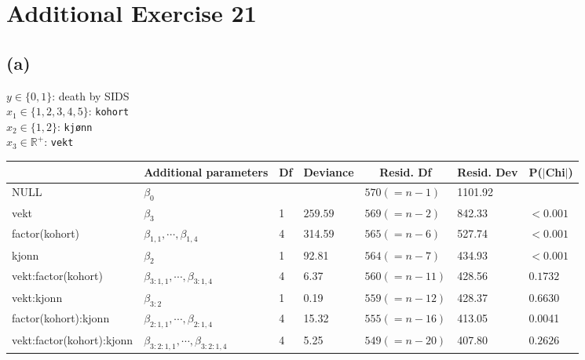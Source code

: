 \section*{Additional Exercise 21}
\subsection*{(a)}
$y \in \{0,1\}$: death by SIDS\\
$x_{1} \in \{1,2,3,4,5\}$: \texttt{kohort}\\
$x_{2} \in \{1,2\}$: \texttt{kj{\o}nn}\\
$x_{3} \in \mathbb{R}^{+}$: \texttt{vekt}\\

\begin{table}[ht]
\centering
\begin{tabular}{l|l|l|l|l|l|l|}
\cline{2-7}
\multicolumn{1}{c|}{} & Additional parameters & \multicolumn{1}{c|}{Df} & \multicolumn{1}{c|}{Deviance} & \multicolumn{1}{c|}{Resid. Df} & \multicolumn{1}{c|}{Resid. Dev} & P($\vert$Chi$\vert$) \\ \hline
%
\multicolumn{1}{|l|}{NULL} & $\beta_{0}$ & & & {\color[HTML]{3531FF} $570 (=n-1)$} & {\color[HTML]{3531FF} 1101.92} & \\ \hline
\multicolumn{1}{|l|}{vekt} & $\beta_{3}$ & 1 & $259.59$ & {\color[HTML]{3531FF} $569 (=n-2)$} & {\color[HTML]{3531FF} 842.33} & $< 0.001$ \\ \hline
\multicolumn{1}{|l|}{factor(kohort)} & $\beta_{1,1}, \cdots, \beta_{1,4}$ & 4 & 314.59 & $565 (=n-6)$ & {\color[HTML]{3531FF} 527.74} & $< 0.001$ \\ \hline
\multicolumn{1}{|l|}{kjonn} & $\beta_{2}$ & 1 & 92.81 & $564 (=n-7)$ & {\color[HTML]{3531FF} 434.93} & $< 0.001$ \\ \hline
\multicolumn{1}{|l|}{vekt:factor(kohort)} & $\beta_{3:1,1}, \cdots, \beta_{3:1,4}$ & 4 & 6.37 & $560 (=n-11)$ & {\color[HTML]{3531FF} 428.56} & $0.1732$ \\ \hline
\multicolumn{1}{|l|}{vekt:kjonn} & $\beta_{3:2}$ & 1 & 0.19 & $559 (=n-12)$ & {\color[HTML]{3531FF} 428.37} & $0.6630$ \\ \hline
\multicolumn{1}{|l|}{factor(kohort):kjonn} & $\beta_{2:1,1}, \cdots, \beta_{2:1,4}$ & 4 & 15.32 & $555 (=n-16)$ & {\color[HTML]{3531FF} 413.05} & {\color[HTML]{3531FF} 0.0041} \\ \hline
\multicolumn{1}{|l|}{vekt:factor(kohort):kjonn} & $\beta_{3:2:1,1}, \cdots, \beta_{3:2:1,4}$ & 4 & 5.25 & $549 (=n-20)$ & {\color[HTML]{3531FF} 407.80} & $0.2626$\\ \hline
\end{tabular}
\end{table}

